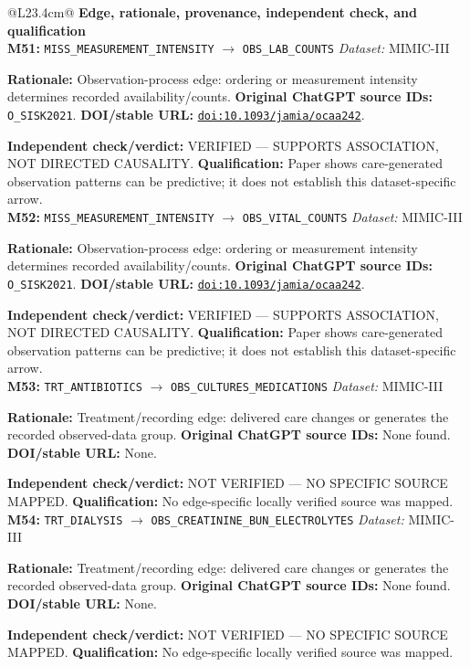 \begin{tabular}{@{}L{23.4cm}@{}}
\toprule
\textbf{Edge, rationale, provenance, independent check, and qualification}\\
\midrule
\textbf{M51:} \nolinkurl{MISS_MEASUREMENT_INTENSITY} $\rightarrow$ \nolinkurl{OBS_LAB_COUNTS} \hfill \textit{Dataset:} MIMIC-III\par\textbf{Rationale:} Observation-process edge: ordering or measurement intensity determines recorded availability/counts. \textbf{Original ChatGPT source IDs:} \nolinkurl{O_SISK2021}. \textbf{DOI/stable URL:} \href{https://doi.org/10.1093/jamia/ocaa242}{\nolinkurl{doi:10.1093/jamia/ocaa242}}.\par\textbf{Independent check/verdict:} VERIFIED --- SUPPORTS ASSOCIATION, NOT DIRECTED CAUSALITY. \textbf{Qualification:} Paper shows care-generated observation patterns can be predictive; it does not establish this dataset-specific arrow. \\
\addlinespace[2pt]
\midrule
\textbf{M52:} \nolinkurl{MISS_MEASUREMENT_INTENSITY} $\rightarrow$ \nolinkurl{OBS_VITAL_COUNTS} \hfill \textit{Dataset:} MIMIC-III\par\textbf{Rationale:} Observation-process edge: ordering or measurement intensity determines recorded availability/counts. \textbf{Original ChatGPT source IDs:} \nolinkurl{O_SISK2021}. \textbf{DOI/stable URL:} \href{https://doi.org/10.1093/jamia/ocaa242}{\nolinkurl{doi:10.1093/jamia/ocaa242}}.\par\textbf{Independent check/verdict:} VERIFIED --- SUPPORTS ASSOCIATION, NOT DIRECTED CAUSALITY. \textbf{Qualification:} Paper shows care-generated observation patterns can be predictive; it does not establish this dataset-specific arrow. \\
\addlinespace[2pt]
\midrule
\textbf{M53:} \nolinkurl{TRT_ANTIBIOTICS} $\rightarrow$ \nolinkurl{OBS_CULTURES_MEDICATIONS} \hfill \textit{Dataset:} MIMIC-III\par\textbf{Rationale:} Treatment/recording edge: delivered care changes or generates the recorded observed-data group. \textbf{Original ChatGPT source IDs:} None found. \textbf{DOI/stable URL:} None.\par\textbf{Independent check/verdict:} NOT VERIFIED --- NO SPECIFIC SOURCE MAPPED. \textbf{Qualification:} No edge-specific locally verified source was mapped. \\
\addlinespace[2pt]
\midrule
\textbf{M54:} \nolinkurl{TRT_DIALYSIS} $\rightarrow$ \nolinkurl{OBS_CREATININE_BUN_ELECTROLYTES} \hfill \textit{Dataset:} MIMIC-III\par\textbf{Rationale:} Treatment/recording edge: delivered care changes or generates the recorded observed-data group. \textbf{Original ChatGPT source IDs:} None found. \textbf{DOI/stable URL:} None.\par\textbf{Independent check/verdict:} NOT VERIFIED --- NO SPECIFIC SOURCE MAPPED. \textbf{Qualification:} No edge-specific locally verified source was mapped. \\

\end{tabular}
